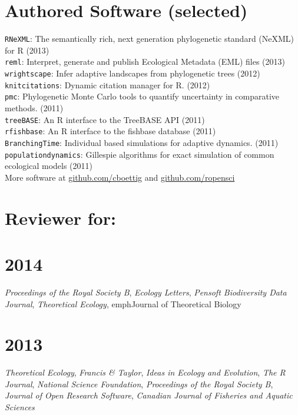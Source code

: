 \documentclass[margin]{res}
\begin{document}
\begin{resume}
  
  \section{Authored Software (selected)} 
{ \footnotesize
\texttt{RNeXML}: The semantically rich, next generation phylogenetic standard (NeXML) for R (2013) \\
\texttt{reml}: Interpret, generate and publish Ecological Metadata (EML) files (2013) \\
\texttt{wrightscape}: Infer adaptive landscapes from phylogenetic trees (2012) \\
\texttt{knitcitations}: Dynamic citation manager for R. (2012) \\
\texttt{pmc}: Phylogenetic Monte Carlo tools to quantify uncertainty in comparative methods. (2011)\\
\texttt{treeBASE}: An R interface to the TreeBASE API (2011) \\
\texttt{rfishbase}: An R interface to the fishbase database (2011) \\
\texttt{BranchingTime}: Individual based simulations for adaptive dynamics. (2011) \\
\texttt{populationdynamics}: Gillespie algorithms for exact simulation of common ecological models (2011) \\ 
More software at \href{http://github.com/cboettig}{github.com/cboettig} and \href{http://github.com/ropensci}{github.com/ropensci} 
}

\section{Reviewer for:}

\section{\textnormal{2014}}
\emph{Proceedings of the Royal Society B}, \emph{Ecology Letters}, \emph{Pensoft Biodiversity Data Journal}, \emph{Theoretical Ecology}, emph{Journal of Theoretical Biology}

\section{\textnormal{2013}}
\emph{Theoretical Ecology}, \emph{Francis \& Taylor}, \emph{Ideas in Ecology and Evolution}, \emph{The R Journal}, \emph{National Science Foundation}, \emph{Proceedings of the Royal Society B}, \emph{Journal of Open Research Software}, \emph{Canadian Journal of Fisheries and Aquatic Sciences} 


\end{resume}
\end{document}
